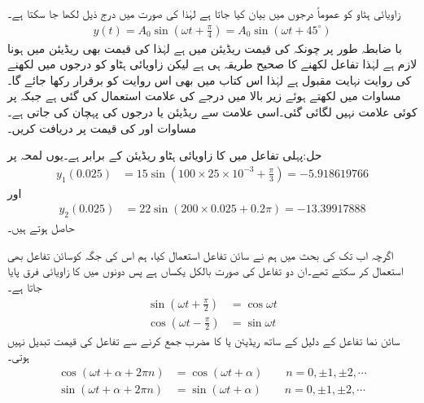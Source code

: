 زاویائی ہٹاو کو عموماً درجوں میں بیان کیا جاتا ہے لہٰذا  کی صورت میں درج ذیل لکھا جا سکتا  ہے۔
\begin{align}\label{مساوات_بدلتا_زاویہ_ہٹاو_روایتی_طریقہ}
y(t)=A_0 \sin \left(\omega t +\frac{\pi}{4}\right)=A_0 \sin\left(\omega t+45^{\circ}\right)
\end{align}
با ضابطہ طور پر چونکہ  کی قیمت ریڈیئن میں ہے لہٰذا  کی قیمت بھی ریڈیئن میں ہونا لازم ہے لہٰذا تفاعل لکھنے کا صحیح طریقہ  ہی ہے لیکن زاویائی ہٹاو کو درجوں میں لکھنے کی روایت نہایت مقبول ہے لہٰذا اس کتاب میں بھی اس روایت کو برقرار رکھا جائے گا۔مساوات  میں  لکھتے ہوئے زیر بالا میں درجے کی علامت  استعمال کی گئی ہے جبکہ  پر کوئی علامت نہیں لگائی گئی۔اسی علامت سے ریڈیئن یا درجوں کی پہچان کی جاتی ہے۔
مساوات  اور  کی قیمت  پر دریافت کریں۔

حل:پہلی تفاعل میں  کا زاویائی ہٹاو  ریڈیئن کے برابر ہے۔یوں
 لمحہ  پر
\begin{align*}
y_1(0.025)&=15\sin\left(100\times 25\times 10^{-3}+\frac{\pi}{3}\right)=-5.918619766
\end{align*}
اور
\begin{align*}
y_2(0.025)&=22\sin(200\times 0.025+0.2\pi)=-13.39917888
\end{align*}
حاصل ہوتے ہیں۔

اگرچہ اب تک کی بحث میں ہم نے سائن تفاعل استعمال کیا، ہم اس کی جگہ کوسائن تفاعل بھی استعمال کر سکتے تھے۔ان دو تفاعل کی صورت بالکل یکساں ہے پس دونوں میں  کا زاویائی فرق پایا جاتا ہے۔
\begin{align}
\sin \left(\omega t+\frac{\pi}{2}\right)&=\cos \omega t\\
\cos \left(\omega t-\frac{\pi}{2}\right)&=\sin \omega t
\end{align}
سائن نما تفاعل کے دلیل  کے ساتھ  ریڈیئن یا  کا مضرب جمع کرنے سے  تفاعل کی قیمت تبدیل نہیں ہوتی۔
\begin{align}
\cos(\omega t +\alpha+2\pi n)&=\cos(\omega t +\alpha) \quad \quad  n=0,\pm 1, \pm 2, \cdots \label{مساوات_بدلتا_طول_بعد_وہی_موج}\\
\sin(\omega t +\alpha+2\pi n)&=\sin(\omega t +\alpha) \quad \quad  n=0,\pm 1, \pm 2, \cdots \label{مساوات_بدلتا_طول_بعد_وہی_موج_ب}
\end{align}

